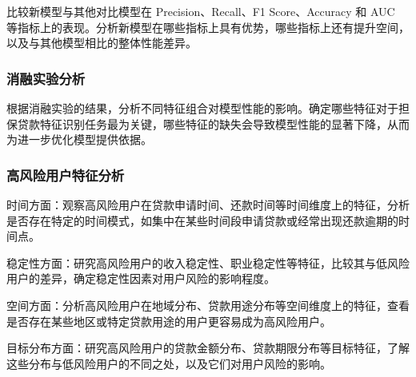 \documentclass{article}
\begin{document}
比较新模型与其他对比模型在 Precision、Recall、F1 Score、Accuracy 和 AUC 等指标上的表现。分析新模型在哪些指标上具有优势，哪些指标上还有提升空间，以及与其他模型相比的整体性能差异。

\subsubsection{消融实验分析}

根据消融实验的结果，分析不同特征组合对模型性能的影响。确定哪些特征对于担保贷款特征识别任务最为关键，哪些特征的缺失会导致模型性能的显著下降，从而为进一步优化模型提供依据。

\subsubsection{高风险用户特征分析}

时间方面：观察高风险用户在贷款申请时间、还款时间等时间维度上的特征，分析是否存在特定的时间模式，如集中在某些时间段申请贷款或经常出现还款逾期的时间点。

稳定性方面：研究高风险用户的收入稳定性、职业稳定性等特征，比较其与低风险用户的差异，确定稳定性因素对用户风险的影响程度。

空间方面：分析高风险用户在地域分布、贷款用途分布等空间维度上的特征，查看是否存在某些地区或特定贷款用途的用户更容易成为高风险用户。

目标分布方面：研究高风险用户的贷款金额分布、贷款期限分布等目标特征，了解这些分布与低风险用户的不同之处，以及它们对用户风险的影响。
\end{document}
